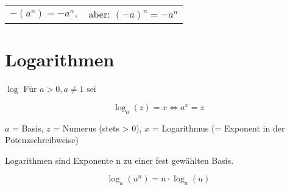 \begin{multicols}{2}
\begin{tabular}{cc}
 $-(a^n) = -a^n,$ & aber: $(-a)^n = -a^n$\\
 \end{tabular} 


\section{Logarithmen}

\begin{definition}{$\log$}{}
Für $a>0, a\ne 1$ sei

$$\log_a{}(z)=x \Longleftrightarrow{} a^x = z$$
\end{definition}
$a$ = Basis, $z$ = Numerus (stets > 0), $x$ = Logarithmus (= Exponent in der Potenzschreibweise)

Logarithmen sind Exponente n zu einer fest gewählten Basis.

\begin{gesetz}{}{}
$$\log_a(u^n) = n\cdot{}\log_a(u)$$
\end{gesetz}









\end{multicols}


